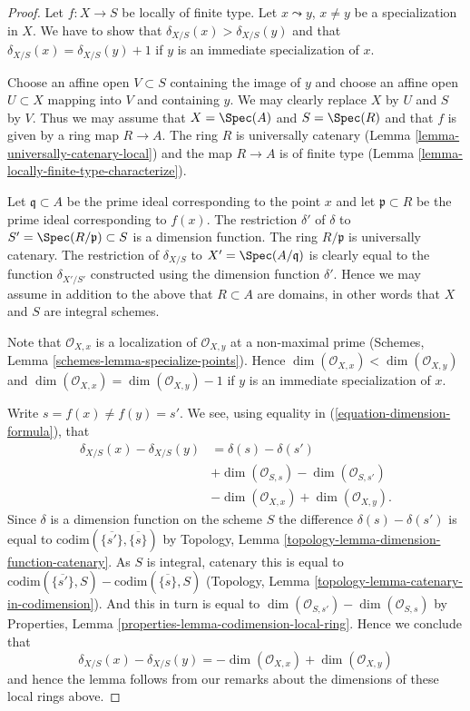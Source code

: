 \begin{proof}
Let $f : X \to S$ be locally of finite type.
Let $x \leadsto y$, $x \not = y$ be a specialization in $X$.
We have to show that $\delta_{X/S}(x) > \delta_{X/S}(y)$ and
that $\delta_{X/S}(x) = \delta_{X/S}(y) + 1$ if $y$ is an
immediate specialization of $x$.

\medskip\noindent
Choose an affine open $V \subset S$ containing the image of
$y$ and choose an affine open $U \subset X$ mapping into $V$
and containing $y$. We may clearly replace $X$ by $U$ and
$S$ by $V$. Thus we may assume that $X = \Spec(A)$
and $S = \Spec(R)$ and that $f$ is given by a ring
map $R \to A$. The ring $R$ is universally catenary
(Lemma \ref{lemma-universally-catenary-local})
and the map $R \to A$ is of finite type
(Lemma \ref{lemma-locally-finite-type-characterize}).

\medskip\noindent
Let $\mathfrak q \subset A$ be the prime ideal corresponding
to the point $x$ and let $\mathfrak p \subset R$ be the prime
ideal corresponding to $f(x)$. The restriction $\delta'$ of $\delta$
to $S' = \Spec(R/\mathfrak p) \subset S$ is a dimension
function. The ring $R/\mathfrak p$ is universally catenary.
The restriction of $\delta_{X/S}$ to $X' = \Spec(A/\mathfrak q)$
is clearly equal to the function $\delta_{X'/S'}$ constructed
using the dimension function $\delta'$. Hence we may assume
in addition to the above that $R \subset A$ are domains, in
other words that $X$ and $S$ are integral schemes.

\medskip\noindent
Note that $\mathcal{O}_{X, x}$ is a localization of
$\mathcal{O}_{X, y}$ at a non-maximal prime
(Schemes, Lemma \ref{schemes-lemma-specialize-points}).
Hence $\dim(\mathcal{O}_{X, x}) < \dim(\mathcal{O}_{X, y})$
and $\dim(\mathcal{O}_{X, x}) = \dim(\mathcal{O}_{X, y}) - 1$
if $y$ is an immediate specialization of $x$.

\medskip\noindent
Write $s = f(x) \not = f(y) = s'$. We see, using equality
in (\ref{equation-dimension-formula}), that
\begin{align*}
\delta_{X/S}(x) - \delta_{X/S}(y) & = \delta(s) - \delta(s') \\
& + \dim(\mathcal{O}_{S, s}) - \dim(\mathcal{O}_{S, s'}) \\
& - \dim(\mathcal{O}_{X, x}) + \dim(\mathcal{O}_{X, y}).
\end{align*}
Since $\delta$ is a dimension function on the scheme $S$ the difference
$\delta(s) - \delta(s')$ is equal to
$\text{codim}(\overline{\{s'\}}, \overline{\{s\}})$ by
Topology, Lemma \ref{topology-lemma-dimension-function-catenary}.
As $S$ is integral, catenary this is equal to
$\text{codim}(\overline{\{s'\}}, S) - \text{codim}(\overline{\{s\}}, S)$
(Topology, Lemma \ref{topology-lemma-catenary-in-codimension}).
And this in turn is equal to
$\dim(\mathcal{O}_{S, s'}) - \dim(\mathcal{O}_{S, s})$ by
Properties, Lemma
\ref{properties-lemma-codimension-local-ring}.
Hence we conclude that
$$
\delta_{X/S}(x) - \delta_{X/S}(y)
=
- \dim(\mathcal{O}_{X, x}) + \dim(\mathcal{O}_{X, y})
$$
and hence the lemma follows from our remarks about the dimensions
of these local rings above.
\end{proof}

